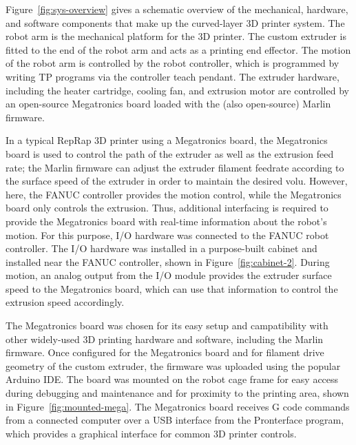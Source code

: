 Figure~\ref{fig:sys-overview} gives a schematic overview of the mechanical, hardware, and software components that make up the curved-layer 3D printer system. The robot arm is the mechanical platform for the 3D printer. The custom extruder is fitted to the end of the robot arm and acts as a printing end effector. The motion of the robot arm is controlled by the robot controller, which is programmed by writing TP programs via the controller teach pendant. The extruder hardware, including the heater cartridge, cooling fan, and extrusion motor are controlled by an open-source Megatronics board loaded with the (also open-source) Marlin firmware. 

In a typical RepRap 3D printer using a Megatronics board, the Megatronics board is used to control the path of the extruder as well as the extrusion feed rate; the Marlin firmware can adjust the extruder filament feedrate according to the surface speed of the extruder in order to maintain the desired volu. However, here, the FANUC controller provides the motion control, while the Megatronics board only controls the extrusion. Thus, additional interfacing is required to provide the Megatronics board with real-time information about the robot's motion. For this purpose, I/O hardware was connected to the FANUC robot controller. The I/O hardware was installed in a purpose-built cabinet and installed near the FANUC controller, shown in Figure~\ref{fig:cabinet-2}. During motion, an analog output from the I/O module provides the extruder surface speed to the Megatronics board, which can use that information to control the extrusion speed accordingly.

The Megatronics board was chosen for its easy setup and campatibility with other widely-used 3D printing hardware and software, including the Marlin firmware. Once configured for the Megatronics board and for filament drive geometry of the custom extruder, the firmware was uploaded using the popular Arduino IDE. The board was mounted on the robot cage frame for easy access during debugging and maintenance and for proximity to the printing area, shown in Figure~\ref{fig:mounted-mega}. The Megatronics board receives G code commands from a connected computer over a USB interface from the Pronterface program, which provides a graphical interface for common 3D printer controls. 

